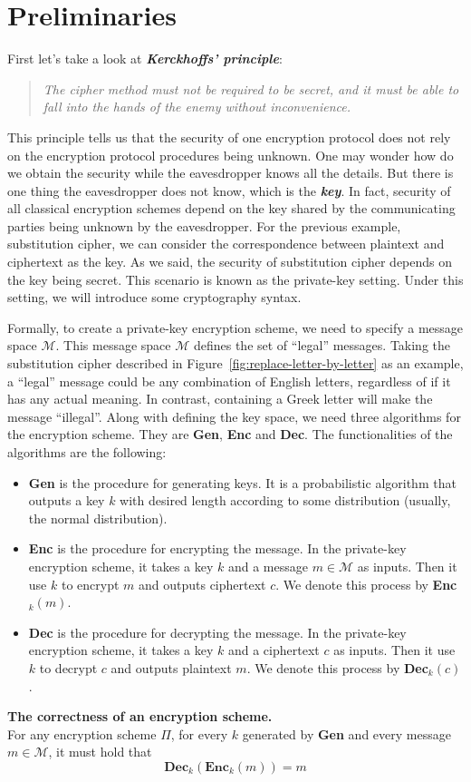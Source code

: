 \section{Preliminaries}
\par First let's take a look at \textbf{\textit{Kerckhoffs’ principle}}:
\begin{quote}
    \textit{The cipher method must not be required to be secret, and it must be able to fall into the hands of the enemy without inconvenience.}
\end{quote}
This principle tells us that the security of one encryption protocol does not rely on the encryption protocol procedures being unknown. One may wonder how do we obtain the security while the eavesdropper knows all the details. But there is one thing the eavesdropper does not know, which is the \textbf{\textit{key}}. In fact, security of all classical encryption schemes depend on the key shared by the communicating parties being unknown by the eavesdropper. For the previous example, substitution cipher, we can consider the correspondence between plaintext and ciphertext as the key. As we said, the security of substitution cipher depends on the key being secret. This scenario is known as the private-key setting. Under this setting, we will introduce some cryptography syntax.
\par Formally, to create a private-key encryption scheme, we need to specify a message space $\mathcal{M}$. This message space $\mathcal{M}$ defines the set of ``legal'' messages. Taking the substitution cipher described in Figure~\ref{fig:replace-letter-by-letter} as an example, a ``legal'' message could be any combination of English letters, regardless of if it has any actual meaning. In contrast, containing a Greek letter will make the message  ``illegal''. Along with defining the key space, we need three algorithms for the encryption scheme. They are \textbf{Gen}, \textbf{Enc} and \textbf{Dec}. The functionalities of the algorithms are the following:
\begin{itemize}
    \item \textbf{Gen} is the procedure for generating keys. It is a probabilistic algorithm that outputs a key $k$ with desired length according to some distribution (usually, the normal distribution).
    \item \textbf{Enc} is the procedure for encrypting the message. In the private-key encryption scheme, it takes a key $k$ and a message $m \in \mathcal{M}$ as inputs. Then it use $k$ to encrypt $m$ and outputs ciphertext $c$. We denote this process by \textbf{Enc}$_k(m)$.
    \item \textbf{Dec} is the procedure for decrypting the message. In the private-key encryption scheme, it takes a key $k$ and a ciphertext $c$ as inputs. Then it use $k$ to decrypt $c$ and outputs plaintext $m$. We denote this process by \textbf{Dec}$_k(c)$.
\end{itemize}
\begin{definition} \textbf{The correctness of an encryption scheme.} \\
    For any encryption scheme $\Pi$, for every $k$ generated by \textbf{Gen} and every message $m \in \mathcal{M}$, it must hold that \[\textbf{Dec}_k(\textbf{Enc}_k(m)) = m\]
\end{definition}

